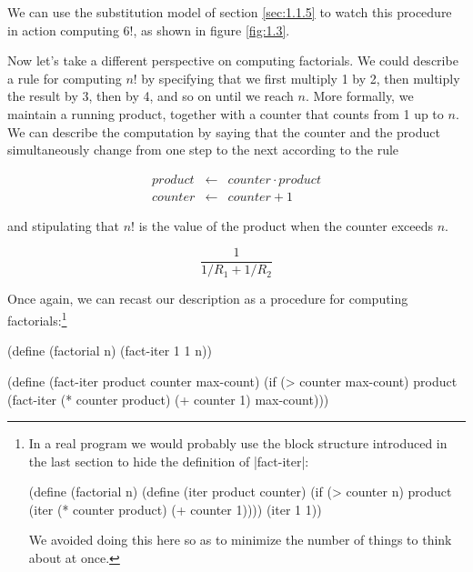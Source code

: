 We can use the substitution model of section \ref{sec:1.1.5} to watch
this procedure in action computing $6!$, as shown in figure
\ref{fig:1.3}.

Now let's take a different perspective on computing factorials.  We
could describe a rule for computing $n!$ by specifying that we first
multiply 1 by 2, then multiply the result by 3, then by 4, and so on
until we reach $n$.  More formally, we maintain a running product,
together with a counter that counts from 1 up to $n$.  We can describe
the computation by saying that the counter and the product
simultaneously change from one step to the next according to the rule

\begin{eqnarray}
  product &  \leftarrow & counter \cdot product \\
  counter  & \leftarrow &  counter  +  1
\end{eqnarray}


and stipulating that $n!$ is the value of the product when
the counter exceeds $n$.

\begin{equation}
  \frac{1}{1 / R_1 + 1 / R_2}
  \label{fig:1.4}
\end{equation}

\begin{schemeregion}
Once again, we can recast our description as a procedure for computing
factorials:\footnote{In a real program we would probably use the block
  structure introduced in the last section to hide the definition of
  \scheme|fact-iter|:
\begin{schemedisplay}
(define (factorial n)
  (define (iter product counter)
    (if (> counter n)
        product
        (iter (* counter product)
              (+ counter 1))))
  (iter 1 1))
\end{schemedisplay}

We avoided doing this here so as to minimize the number of things to
think about at once.}
\end{schemeregion}

\begin{schemedisplay}
(define (factorial n)
  (fact-iter 1 1 n))

(define (fact-iter product counter max-count)
  (if (> counter max-count)
      product
      (fact-iter (* counter product)
                 (+ counter 1)
                 max-count)))
\end{schemedisplay}


